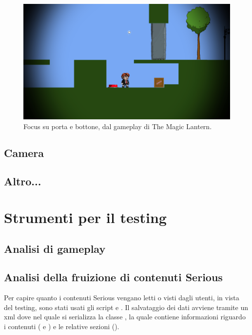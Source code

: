 \begin{figure}[h]
\centerline{\includegraphics[scale=0.35]{images/development/portaebottone.png}}
\caption{Focus su porta e bottone, dal gameplay di The Magic Lantern.}
\label{fig:portaebottone}
\end{figure}

\subsection{Camera}

\subsection{Altro...}

\section{Strumenti per il testing}

\subsection{Analisi di gameplay}

\subsection{Analisi della fruizione di contenuti Serious}

Per capire quanto i contenuti Serious vengano letti o visti dagli utenti, in vista del testing, sono stati usati gli script  e . Il salvataggio dei dati avviene tramite un xml dove nel quale si serializza la classe , la quale contiene informazioni riguardo i contenuti ( e ) e le relative sezioni ().

